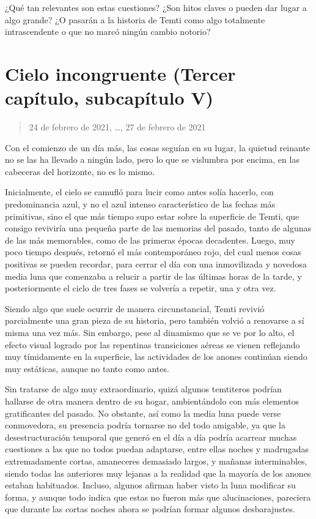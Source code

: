 \documentclass[
  spanish,
]{book}
\begin{document}
¿Qué tan relevantes son estas cuestiones? ¿Son hitos claves o pueden dar lugar a algo grande? ¿O pasarán a la historia de Temti como algo totalmente intrascendente o que no marcó ningún cambio notorio?

\hypertarget{cielo-incongruente-tercer-capuxedtulo-subcapuxedtulo-v}{%
\section{Cielo incongruente (Tercer capítulo, subcapítulo V)}\label{cielo-incongruente-tercer-capuxedtulo-subcapuxedtulo-v}}

\begin{quote}
24 de febrero de 2021, \ldots, 27 de febrero de 2021
\end{quote}

Con el comienzo de un día más, las cosas seguían en su lugar, la quietud reinante no se las ha llevado a ningún lado, pero lo que se vislumbra por encima, en las cabeceras del horizonte, no es lo mismo.

Inicialmente, el cielo se camufló para lucir como antes solía hacerlo, con predominancia azul, y no el azul intenso característico de las fechas más primitivas, sino el que más tiempo supo estar sobre la superficie de Temti, que consigo reviviría una pequeña parte de las memorias del pasado, tanto de algunas de las más memorables, como de las primeras épocas decadentes. Luego, muy poco tiempo después, retornó el más contemporáneo rojo, del cual menos cosas positivas se pueden recordar, para cerrar el día con una inmovilizada y novedosa media luna que comenzaba a relucir a partir de las últimas horas de la tarde, y posteriormente el ciclo de tres fases se volvería a repetir, una y otra vez.

Siendo algo que suele ocurrir de manera circunstancial, Temti revivió parcialmente una gran pieza de su historia, pero también volvió a renovarse a sí misma una vez más. Sin embargo, pese al dinamismo que se ve por lo alto, el efecto visual logrado por las repentinas transiciones aéreas se vienen reflejando muy tímidamente en la superficie, las actividades de los anones continúan siendo muy estáticas, aunque no tanto como antes.

Sin tratarse de algo muy extraordinario, quizá algunos temtiteros podrían hallarse de otra manera dentro de su hogar, ambientándolo con más elementos gratificantes del pasado. No obstante, así como la media luna puede verse conmovedora, su presencia podría tornarse no del todo amigable, ya que la desestructuración temporal que generó en el día a día podría acarrear muchas cuestiones a las que no todos puedan adaptarse, entre ellas noches y madrugadas extremadamente cortas, amaneceres demasiado largos, y mañanas interminables, siendo todas las anteriores muy lejanas a la realidad que la mayoría de los anones estaban habituados. Incluso, algunos afirman haber visto la luna modificar su forma, y aunque todo indica que estas no fueron más que alucinaciones, pareciera que durante las cortas noches ahora se podrían formar algunos desbarajustes.
\end{document}
